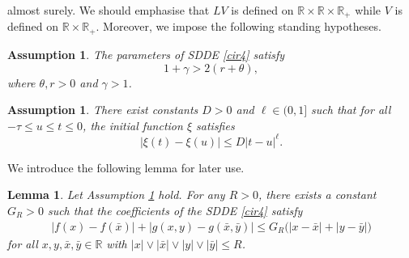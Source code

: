 \documentclass[11pt]{article}
\newtheorem{lemma}[definition]{Lemma}
\newtheorem{assumption}[definition]{Assumption}
\begin{document}
almost surely. We should emphasise that $LV$ is defined on $\mathbb{R}\times \mathbb{R}\times \mathbb{R}_+$ while $V$ is defined on $\mathbb{R}\times \mathbb{R}_+$. Moreover, we impose the following standing hypotheses.
\begin{assumption} \label{sec2:assump:1} 
The parameters of \textup{SDDE} \eqref{cir4} satisfy 
\begin{equation}
1+ \gamma > 2(r+\theta),
\end{equation}
where  $\theta, r>0$ and $\gamma>1$.
\end{assumption}
\begin{assumption}\label{sec2:assump:2} 
There exist constants $D>0$ and $\ell\in (0,1]$ such that for all $ -\tau\leq u \leq t \leq 0$, the initial function $\xi$ satisfies
\begin{equation}\label{eq:15}
  |\xi(t)-\xi(u)|\le D|t-u|^{\ell}.
\end{equation}
\end{assumption}

\noindent We introduce the following lemma for later use.

\begin{lemma}\label{lemma1}
Let Assumption \ref{sec2:assump:1} hold. For any $R>0$, there exists a constant $G_R>0$ such that the coefficients of the \textup{SDDE} \eqref{cir4} satisfy
\begin{align}
| f(x)-f(\bar{x}) | + | g(x,y)-g(\bar{x},\bar{y}) |
\le G_R \big( |x-\bar{x}| + |y-\bar{y}| \big)
\end{align}
for all $x,y,\bar{x},\bar{y}\in \mathbb{R}$ with 
$|x|\vee |\bar{x}|\vee |y|\vee |\bar{y}| \le R$.
\end{lemma}
\end{document}
